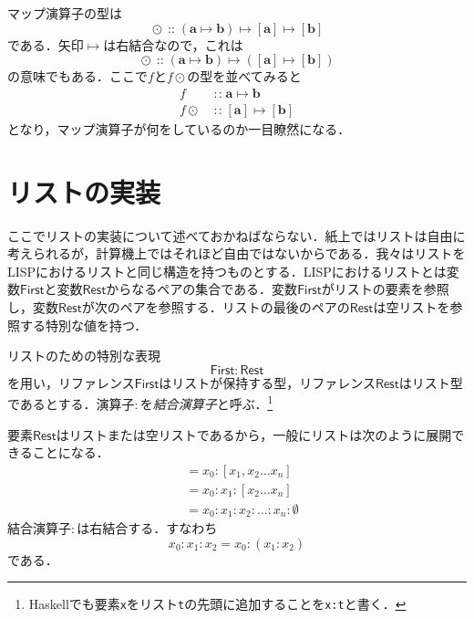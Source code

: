 \documentclass[twocolumn]{jsbook}
\newcommand{\programminglanguage}[1]{\textsf{#1}}
\newcommand{\haskell}{\programminglanguage{Haskell}}
\newcommand{\code}[1]{\texttt{#1}}
\newcommand{\keyword}[1]{{\emph{#1}}}
\newcommand{\hsklType}[1]{\textbf{#1}}
\DeclareMathOperator{\hsklMap}{\odot}
\DeclareMathOperator{\hsklOf}{::}
\newcommand{\hsklEmptyList}{\emptyset}
\newcommand{\hsklListType}[1]{[#1]}
\newcommand{\mathVarKeyword}[1]{\mathsf{#1}}
\DeclareMathOperator{\mathIn}{:\!:}
\DeclareMathOperator{\mathMapsTo}{\mapsto}
\newcommand{\mathFirst}{\mathVarKeyword{First}}
\newcommand{\mathRest}{\mathVarKeyword{Rest}}
\newcommand{\mathMorph}[2]{#1\mathMapsTo#2}
\newcommand{\mathMorphII}[3]{#1\mathMapsTo#2\mathMapsTo#3}
\begin{document}
マップ演算子の型は
\begin{equation*}
\hsklMap\hsklOf{}\mathMorphII{(\mathMorph{\hsklType{a}}{\hsklType{b}})}{\hsklListType{\hsklType{a}}}{\hsklListType{\hsklType{b}}}
\end{equation*}
である．矢印$\mathMapsTo$は右結合なので，これは
\begin{equation*}
\hsklMap\hsklOf{}\mathMorph{(\mathMorph{\hsklType{a}}{\hsklType{b}})}{(\mathMorph{\hsklListType{\hsklType{a}}}{\hsklListType{\hsklType{b}}})}
\end{equation*}
の意味でもある．ここで$f$と$f\hsklMap$の型を並べてみると
\begin{align*}
f&\mathIn\mathMorph{\hsklType{a}}{\hsklType{b}}\\
f\hsklMap&\mathIn\mathMorph{\hsklListType{\hsklType{a}}}{\hsklListType{\hsklType{b}}}
\end{align*}
となり，マップ演算子が何をしているのか一目瞭然になる．

\section{リストの実装}

ここでリストの実装について述べておかねばならない．紙上ではリストは自由に考えられるが，計算機上ではそれほど自由ではないからである．我々はリストをLISPにおけるリストと同じ構造を持つものとする．LISPにおけるリストとは変数$\mathFirst$と変数$\mathRest$からなるペアの集合である．変数$\mathFirst$がリストの要素を参照し，変数$\mathRest$が次のペアを参照する．リストの最後のペアの$\mathRest$は空リストを参照する特別な値を持つ．

リストのための特別な表現
\begin{equation*}
\mathFirst:\mathRest
\end{equation*}
を用い，リファレンス$\mathFirst$はリストが保持する型，リファレンス$\mathRest$はリスト型であるとする．演算子$:$を\keyword{結合演算子}と呼ぶ．\footnote{\haskell でも要素\code{x}をリスト\code{t}の先頭に追加することを\code{x:t}と書く．}

要素$\mathRest$はリストまたは空リストであるから，一般にリストは次のように展開できることになる．
\begin{align*}
[x_0,x_1,x_2\dots x_n]&=x_0:[x_1,x_2\dots x_n]\\
&=x_0:x_1:[x_2\dots x_n]\\
&=x_0:x_1:x_2:\dots:x_n:\hsklEmptyList
\end{align*}
結合演算子$:$は右結合する．すなわち$$x_0:x_1:x_2=x_0:(x_1:x_2)$$である．
\end{document}
